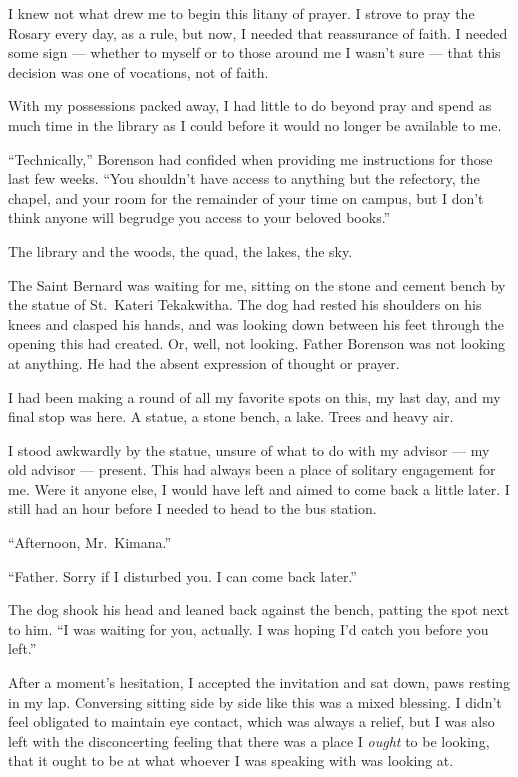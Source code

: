 I knew not what drew me to begin this litany of prayer. I strove to pray the Rosary every day, as a rule, but now, I needed that reassurance of faith. I needed some sign --- whether to myself or to those around me I wasn't sure --- that this decision was one of vocations, not of faith.

With my possessions packed away, I had little to do beyond pray and spend as much time in the library as I could before it would no longer be available to me.

``Technically,'' Borenson had confided when providing me instructions for those last few weeks. ``You shouldn't have access to anything but the refectory, the chapel, and your room for the remainder of your time on campus, but I don't think anyone will begrudge you access to your beloved books.''

The library and the woods, the quad, the lakes, the sky.

The Saint Bernard was waiting for me, sitting on the stone and cement bench by the statue of St.~Kateri Tekakwitha. The dog had rested his shoulders on his knees and clasped his hands, and was looking down between his feet through the opening this had created. Or, well, not looking. Father Borenson was not looking at anything. He had the absent expression of thought or prayer.

I had been making a round of all my favorite spots on this, my last day, and my final stop was here. A statue, a stone bench, a lake. Trees and heavy air.

I stood awkwardly by the statue, unsure of what to do with my advisor --- my old advisor --- present. This had always been a place of solitary engagement for me. Were it anyone else, I would have left and aimed to come back a little later. I still had an hour before I needed to head to the bus station.

``Afternoon, Mr.~Kimana.''

``Father. Sorry if I disturbed you. I can come back later.''

The dog shook his head and leaned back against the bench, patting the spot next to him. ``I was waiting for you, actually. I was hoping I'd catch you before you left.''

After a moment's hesitation, I accepted the invitation and sat down, paws resting in my lap. Conversing sitting side by side like this was a mixed blessing. I didn't feel obligated to maintain eye contact, which was always a relief, but I was also left with the disconcerting feeling that there was a place I \emph{ought} to be looking, that it ought to be at what whoever I was speaking with was looking at.

